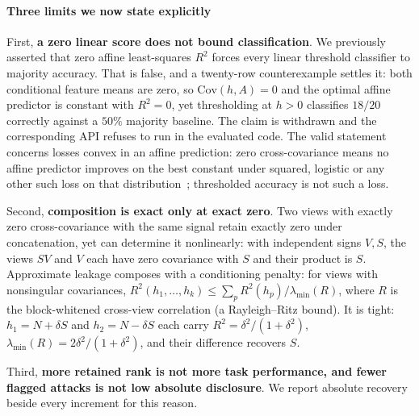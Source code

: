 \documentclass[conference]{IEEEtran}
\begin{document}
\begin{table}[t]
\centering\footnotesize
\caption{Aggregate one-hot versus dominant-axis auditing on the multi-class protected attribute, mean over
pair-seeds of the canonical checkpoints (in-sample ridge scores on held-out test representations). The
aggregate understates the recoverable direction, most on the imbalanced attribute. Historical evidence from the encoder line described in \S\ref{sec:lineage}.}
\label{tab:da}

\end{table}

\paragraph{Three limits we now state explicitly} First, \textbf{a zero linear score does not bound
classification}. We previously asserted that zero affine least-squares $R^2$ forces every linear threshold
classifier to majority accuracy. That is false, and a twenty-row counterexample settles it: both
conditional feature means are zero, so $\mathrm{Cov}(h,A)=0$ and the optimal affine predictor is constant
with $R^2=0$, yet thresholding at $h>0$ classifies $18/20$ correctly against a $50\%$ majority baseline.
The claim is withdrawn and the corresponding API refuses to run in the evaluated code. The valid
statement concerns losses convex in an affine prediction: zero cross-covariance means no affine predictor
improves on the best constant under squared, logistic or any other such loss on that
distribution~\cite{belrose2023leace}; thresholded accuracy is not such a loss.

Second, \textbf{composition is exact only at exact zero}. Two views with exactly zero cross-covariance
with the same signal retain exactly zero under concatenation, yet can determine it nonlinearly: with
independent signs $V,S$, the views $SV$ and $V$ each have zero covariance with $S$ and their product is
$S$. Approximate leakage composes with a conditioning penalty: for views with nonsingular covariances,
$R^2(h_1,\dots,h_k)\le\sum_p R^2(h_p)/\lambda_{\min}(R)$, where $R$ is the block-whitened cross-view
correlation (a Rayleigh--Ritz bound). It is tight: $h_1=N+\delta S$ and $h_2=N-\delta S$ each carry
$R^2=\delta^2/(1+\delta^2)$, $\lambda_{\min}(R)=2\delta^2/(1+\delta^2)$, and their difference recovers $S$.

Third, \textbf{more retained rank is not more task performance, and fewer flagged attacks is not low
absolute disclosure}. We report absolute recovery beside every increment for this reason.
\end{document}
